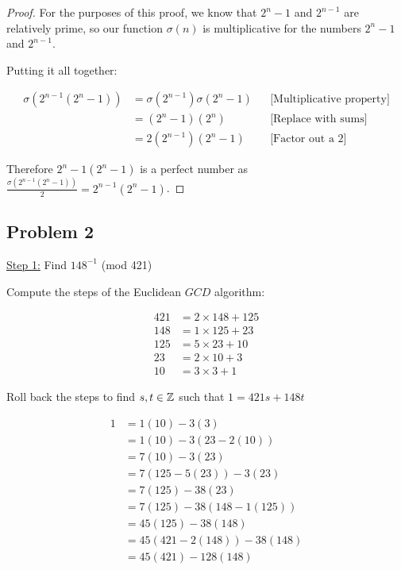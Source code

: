\documentclass[10pt]{article}
\begin{document}
\begin{proof}
  \noindent
  For the purposes of this proof, we know that $2^n - 1$ and $2^{n - 1}$ are relatively prime, so our function $\sigma(n)$
  is multiplicative for the numbers $2^n - 1$ and $2^{n - 1}$.
  \spacing

  \noindent
  Putting it all together:

  \begin{align*}
    \sigma(2^{n - 1}(2^{n} - 1)) &= \sigma(2^{n - 1})\sigma(2^n - 1) && \text{[Multiplicative property]} \\
      &= (2^n - 1)(2^n) && \text{[Replace with sums]} \\
      &= 2(2^{n - 1})(2^n - 1) && \text{[Factor out a 2]}
  \end{align*}

  \noindent
  Therefore $2^n-1(2^n - 1)$ is a perfect number as $\frac{\sigma(2^{n - 1}(2^{n} - 1))}{2} = 2^{n - 1}(2^{n} - 1)$.
\end{proof}

\newpage
\subsection*{Problem 2}

\underline{Step 1:} Find $148^{-1}$ (mod 421)
\spacing

\noindent
Compute the steps of the Euclidean $GCD$ algorithm:

\begin{align*}
  421 &= 2 \times 148 + 125 \\
  148 &= 1 \times 125 + 23 \\
  125 &= 5 \times 23 + 10 \\
  23 &= 2 \times 10 + 3 \\
  10 &= 3 \times 3 + 1
\end{align*}

\spacing
\noindent
Roll back the steps to find $s, t \in \mathbb{Z}$ such that $1 = 421s + 148t$

\begin{align*}
  1 &= 1(10) - 3(3) \\
    &= 1(10) - 3(23 - 2(10)) \\
    &= 7(10) - 3(23) \\
    &= 7(125 - 5(23)) - 3(23) \\
    &= 7(125) - 38(23) \\
    &= 7(125) - 38(148 - 1(125)) \\
    &= 45(125) - 38(148) \\
    &= 45(421 - 2(148)) - 38(148) \\
    &= 45(421) - 128(148)
\end{align*}
\end{document}
